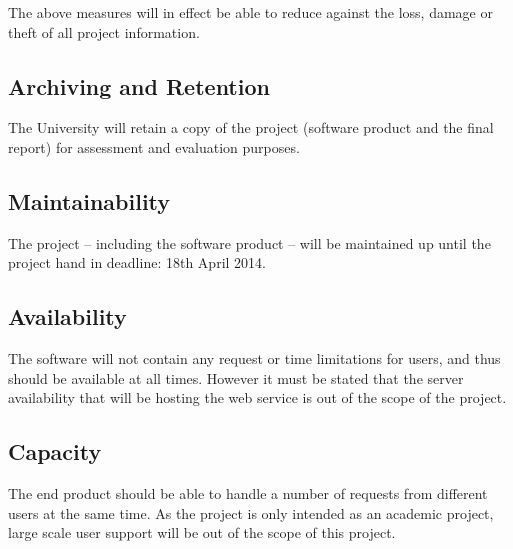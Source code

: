 The above measures will in effect be able to reduce against the loss, damage or 
theft of all project information.


\subsection{Archiving and Retention}

The University will retain a copy of the project (software product and the final
report) for assessment and evaluation purposes. 


\subsection{Maintainability}

The project -- including the software product -- will be maintained up until the
project hand in deadline: 18th April 2014.


\subsection{Availability}

The software will not contain any request or time limitations for users, and 
thus should be available at all times. However it must be stated that the server
availability that will be hosting the web service is out of the scope of the 
project.


\subsection{Capacity}

The end product should be able to handle a number of requests from different 
users at the same time. As the project is only intended as an academic project, 
large scale user support will be out of the scope of this project.
